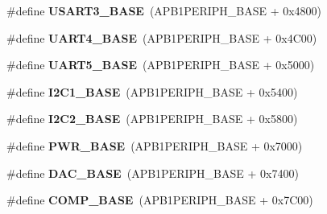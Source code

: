 \begin{DoxyCompactItemize}
\item 
\hypertarget{group___peripheral__memory__map_gabe0d6539ac0026d598274ee7f45b0251}{\#define {\bfseries U\-S\-A\-R\-T3\-\_\-\-B\-A\-S\-E}~(A\-P\-B1\-P\-E\-R\-I\-P\-H\-\_\-\-B\-A\-S\-E + 0x4800)}\label{group___peripheral__memory__map_gabe0d6539ac0026d598274ee7f45b0251}

\item 
\hypertarget{group___peripheral__memory__map_ga94d92270bf587ccdc3a37a5bb5d20467}{\#define {\bfseries U\-A\-R\-T4\-\_\-\-B\-A\-S\-E}~(A\-P\-B1\-P\-E\-R\-I\-P\-H\-\_\-\-B\-A\-S\-E + 0x4\-C00)}\label{group___peripheral__memory__map_ga94d92270bf587ccdc3a37a5bb5d20467}

\item 
\hypertarget{group___peripheral__memory__map_gaa155689c0e206e6994951dc3cf31052a}{\#define {\bfseries U\-A\-R\-T5\-\_\-\-B\-A\-S\-E}~(A\-P\-B1\-P\-E\-R\-I\-P\-H\-\_\-\-B\-A\-S\-E + 0x5000)}\label{group___peripheral__memory__map_gaa155689c0e206e6994951dc3cf31052a}

\item 
\hypertarget{group___peripheral__memory__map_gacd72dbffb1738ca87c838545c4eb85a3}{\#define {\bfseries I2\-C1\-\_\-\-B\-A\-S\-E}~(A\-P\-B1\-P\-E\-R\-I\-P\-H\-\_\-\-B\-A\-S\-E + 0x5400)}\label{group___peripheral__memory__map_gacd72dbffb1738ca87c838545c4eb85a3}

\item 
\hypertarget{group___peripheral__memory__map_ga04bda70f25c795fb79f163b633ad4a5d}{\#define {\bfseries I2\-C2\-\_\-\-B\-A\-S\-E}~(A\-P\-B1\-P\-E\-R\-I\-P\-H\-\_\-\-B\-A\-S\-E + 0x5800)}\label{group___peripheral__memory__map_ga04bda70f25c795fb79f163b633ad4a5d}

\item 
\hypertarget{group___peripheral__memory__map_gac691ec23dace8b7a649a25acb110217a}{\#define {\bfseries P\-W\-R\-\_\-\-B\-A\-S\-E}~(A\-P\-B1\-P\-E\-R\-I\-P\-H\-\_\-\-B\-A\-S\-E + 0x7000)}\label{group___peripheral__memory__map_gac691ec23dace8b7a649a25acb110217a}

\item 
\hypertarget{group___peripheral__memory__map_gad18d0b914c7f68cecbee1a2d23a67d38}{\#define {\bfseries D\-A\-C\-\_\-\-B\-A\-S\-E}~(A\-P\-B1\-P\-E\-R\-I\-P\-H\-\_\-\-B\-A\-S\-E + 0x7400)}\label{group___peripheral__memory__map_gad18d0b914c7f68cecbee1a2d23a67d38}

\item 
\hypertarget{group___peripheral__memory__map_gaa9f5d2999c6918e385d7a526c4f6b1d3}{\#define {\bfseries C\-O\-M\-P\-\_\-\-B\-A\-S\-E}~(A\-P\-B1\-P\-E\-R\-I\-P\-H\-\_\-\-B\-A\-S\-E + 0x7\-C00)}\label{group___peripheral__memory__map_gaa9f5d2999c6918e385d7a526c4f6b1d3}


\end{DoxyCompactItemize}
